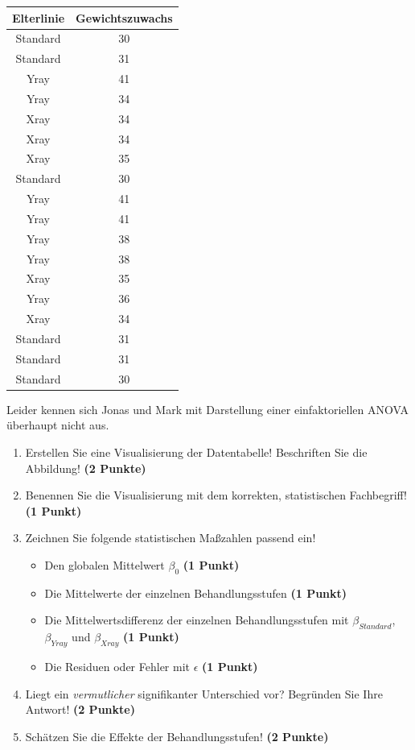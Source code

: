 \documentclass[a4paper, 9pt]{scrartcl}\usepackage[]{graphicx}\usepackage[]{xcolor}
\newenvironment{knitrout}{}{} %
\begin{document}
\begin{knitrout}
\color{fgcolor}\begin{table}[!h]
\centering
\begin{tabular}{cc}
\toprule
Elterlinie & Gewichtszuwachs\\
\midrule
Standard & 30\\
Standard & 31\\
Yray & 41\\
Yray & 34\\
Xray & 34\\
\addlinespace
Xray & 34\\
Xray & 35\\
Standard & 30\\
Yray & 41\\
Yray & 41\\
\addlinespace
Yray & 38\\
Yray & 38\\
Xray & 35\\
Yray & 36\\
Xray & 34\\
\addlinespace
Standard & 31\\
Standard & 31\\
Standard & 30\\
\bottomrule
\end{tabular}
\end{table}

\end{knitrout}

Leider kennen sich Jonas und Mark mit Darstellung einer einfaktoriellen ANOVA überhaupt nicht aus. 

\begin{enumerate}
\item Erstellen  Sie  eine  Visualisierung  der  Datentabelle! Beschriften  Sie  die  Abbildung! \textbf{(2 Punkte)}
\item Benennen Sie die Visualisierung mit dem korrekten, statistischen Fachbegriff! \textbf{(1 Punkt)}
\item Zeichnen Sie folgende statistischen Maßzahlen passend ein! 
  \begin{itemize}
  \item Den globalen Mittelwert $\beta_0$ \textbf{(1 Punkt)}
  \item Die Mittelwerte der einzelnen Behandlungsstufen \textbf{(1 Punkt)}
  \item Die Mittelwertsdifferenz der einzelnen Behandlungsstufen mit $\beta_{Standard}$, $\beta_{Yray}$ und $\beta_{Xray}$ \textbf{(1 Punkt)}
  \item Die Residuen oder Fehler mit $\epsilon$ \textbf{(1 Punkt)}
  \end{itemize}
\item Liegt ein \textit{vermutlicher} signifikanter Unterschied vor? Begründen Sie Ihre Antwort! \textbf{(2 Punkte)}
\item Schätzen Sie die Effekte der Behandlungsstufen! \textbf{(2 Punkte)}
\end{enumerate}
 
\end{document}
